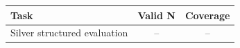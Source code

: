 \begin{tabular}{lcc}
\toprule
Task & Valid N & Coverage \\
\midrule
Silver structured evaluation & -- & -- \\
\bottomrule
\end{tabular}
